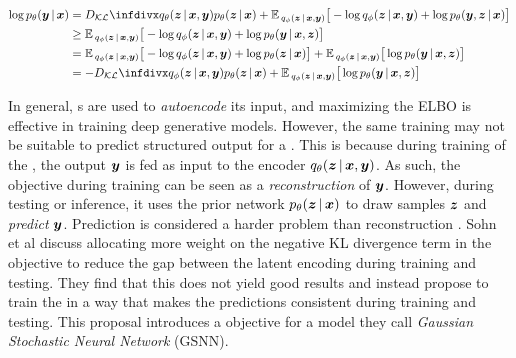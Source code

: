 \begin{equation}
\begin{split}
\log p_{\theta}\given{\vy}{\vx} &= \KL{q_{\theta}\given{\vz}{\vx, \vy}}{p_{\theta}\given{\vz}{\vx}} + \E{}_{q_{\phi}\given{\vz}{\vx, \vy}} \big [ - \log q_{\phi}\given{\vz}{\vx, \vy} + \log p_{\theta}\given{\vy, \vz}{\vx} \big ]
\\
&\geq \E{}_{q_{\phi}\given{\vz}{\vx, \vy}} \big [ - \log q_{\phi}\given{\vz}{\vx, \vy} + \log p_{\theta}\given{\vy}{\vx, \vz} \big ]
\\
&= \E{}_{q_{\phi}\given{\vz}{\vx, \vy}} \big [ - \log q_{\phi}\given{\vz}{\vx, \vy} + \log p_{\theta}\given{\vz}{\vx} \big ] + \E{}_{q_{\phi}\given{\vz}{\vx, \vy}} \big [ \log p_{\theta} \given{\vy}{\vx, \vz} \big ]
\\
&= -\KL{q_{\phi}\given{\vz}{\vx, \vy}}{p_{\theta}\given{\vz}{\vx}} + \E{}_{q_{\phi}\given{\vz}{\vx, \vy}} \big [ \log p_{\theta} \given{\vy}{\vx, \vz} \big ]
\label{eq_cvae}
\end{split}
\end{equation}




In general, \vae{}s are used to \emph{autoencode} its input, and maximizing the ELBO is effective in training deep generative models. However, the same training may not be suitable to predict structured output for a \cvae{}. This is because during training of the \cvae{}, the output $\boldsymbol{y}$ is fed as input to the encoder $q_{\theta}\given{\vz}{\vx, \vy}$. As such, the objective during training can be seen as a \emph{reconstruction} of $\boldsymbol{y}$. However, during testing or inference, it uses the prior network $p_{\theta}\given{\vz}{\vx}$ to draw samples $\boldsymbol{z}$ and \emph{predict} $\boldsymbol{y}$. Prediction is considered a harder problem than reconstruction \parencite{Sohn2015}. Sohn et al discuss allocating more weight on the negative KL divergence term in the objective to reduce the gap between the latent encoding during training and testing. They find that this does not yield good results and instead propose to train the \cvae{} in a way that makes the predictions consistent during training and testing. This proposal introduces a objective for a model they call \emph{Gaussian Stochastic Neural Network} (GSNN).



